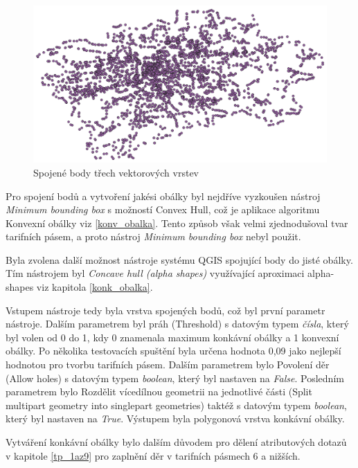 \begin{figure}[H] \centering
    \includegraphics[width=400pt]{./pictures/merged-P0B.png}
    \caption[Spojené body třech vektorových vrstev]{Spojené body třech vektorových vrstev}
	\label{fig:merged-P0B}              
\end{figure} 

Pro spojení bodů a vytvoření jakési obálky byl nejdříve vyzkoušen nástroj \textit{Minimum bounding box} s možností Convex Hull,
což je aplikace algoritmu Konvexní obálky viz \ref{konv_obalka}. Tento způsob však velmi zjednodušoval tvar
tarifních pásem, a proto nástroj \textit{Minimum bounding box} nebyl použit.

Byla zvolena další možnost nástroje systému QGIS spojující body do jisté obálky. Tím nástrojem byl \textit{Concave hull (alpha shapes)} 
využívající aproximaci alpha-shapes viz kapitola \ref{konk_obalka}.

Vstupem nástroje tedy byla vrstva spojených bodů, což byl první parametr
nástroje. Dalším parametrem byl práh (Threshold) s datovým typem \textit{čísla}, který byl volen od 0 do 1,
kdy 0 znamenala maximum konkávní obálky a 1 konvexní obálky. Po několika testovacích spuštění byla 
určena hodnota 0,09 jako nejlepší hodnotou pro tvorbu tarifních pásem. Dalším parametrem bylo Povolení děr (Allow holes) 
s datovým typem \textit{boolean}, který byl nastaven na \textit{False}.
Posledním parametrem bylo Rozdělit vícedílnou geometrii na jednotlivé části (Split multipart geometry 
into singlepart geometries) taktéž s datovým typem \textit{boolean}, který byl nastaven na \textit{True}.  
Výstupem byla polygonová vrstva konkávní obálky. 

Vytváření konkávní obálky bylo dalším důvodem pro dělení atributových dotazů v kapitole \ref{tp_1az9} pro 
zaplnění děr v tarifních pásmech 6 a nižších.  


